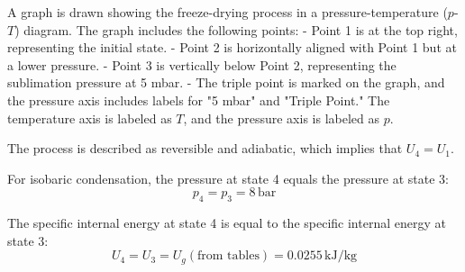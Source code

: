 A graph is drawn showing the freeze-drying process in a pressure-temperature (\( p \)-\( T \)) diagram. The graph includes the following points:  
- Point 1 is at the top right, representing the initial state.  
- Point 2 is horizontally aligned with Point 1 but at a lower pressure.  
- Point 3 is vertically below Point 2, representing the sublimation pressure at 5 mbar.  
- The triple point is marked on the graph, and the pressure axis includes labels for "5 mbar" and "Triple Point."  
The temperature axis is labeled as \( T \), and the pressure axis is labeled as \( p \).

The process is described as reversible and adiabatic, which implies that \( U_4 = U_1 \).  

For isobaric condensation, the pressure at state 4 equals the pressure at state 3:  
\[
p_4 = p_3 = 8 \, \text{bar}
\]  

The specific internal energy at state 4 is equal to the specific internal energy at state 3:  
\[
U_4 = U_3 = U_g (\text{from tables}) = 0.0255 \, \text{kJ/kg}
\]